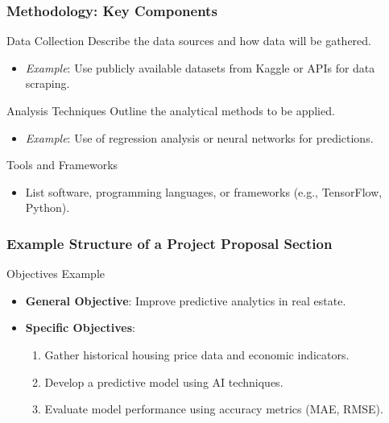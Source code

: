\documentclass[aspectratio=169]{beamer}
\begin{document}
\begin{frame}[fragile]
    \frametitle{Methodology: Key Components}
    \begin{block}{Data Collection}
        Describe the data sources and how data will be gathered. 
        \begin{itemize}
            \item \textit{Example}: Use publicly available datasets from Kaggle or APIs for data scraping.
        \end{itemize}
    \end{block}
    
    \begin{block}{Analysis Techniques}
        Outline the analytical methods to be applied.
        \begin{itemize}
            \item \textit{Example}: Use of regression analysis or neural networks for predictions.
        \end{itemize}
    \end{block}

    \begin{block}{Tools and Frameworks}
        \begin{itemize}
            \item List software, programming languages, or frameworks (e.g., TensorFlow, Python).
        \end{itemize}
    \end{block}
\end{frame}

\begin{frame}[fragile]
    \frametitle{Example Structure of a Project Proposal Section}
    \begin{block}{Objectives Example}
        \begin{itemize}
            \item \textbf{General Objective}: Improve predictive analytics in real estate.
            \item \textbf{Specific Objectives}:
            \begin{enumerate}
                \item Gather historical housing price data and economic indicators.
                \item Develop a predictive model using AI techniques.
                \item Evaluate model performance using accuracy metrics (MAE, RMSE).
            \end{enumerate}
        \end{itemize}
    \end{block}
\end{frame}
\end{document}
